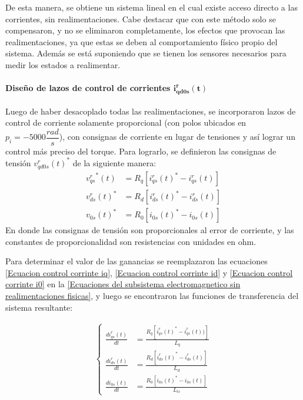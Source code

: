 \documentclass[a4paper, 10pt, onecolumn,journal]{ieeeconf}
\begin{document}
De esta manera, se obtiene un sistema lineal en el cual existe acceso directo a las corrientes, sin realimentaciones. Cabe destacar que con este método solo se compensaron, y no se eliminaron completamente, los efectos que provocan las realimentaciones, ya que  estas se deben al comportamiento físico propio del sistema. Además se está suponiendo que se tienen los sensores necesarios para medir los estados a realimentar.

\paragraph{\textbf{Diseño de lazos de control de corrientes $\mathbf{{i}^r_{qd0s}(t)}$}}
Luego de haber desacoplado todas las realimentaciones, se incorporaron lazos de control de corriente solamente proporcional (con polos ubicados en $p_{i}=-5000\dfrac{rad}{s}$), con consignas de corriente en lugar de tensiones y así lograr un control más preciso del torque.
Para lograrlo, se definieron las consignas de tensión  ${v^r_{qd0s}(t)}^*$ de la siguiente manera:
 \begin{align}
	{v^r_{qs}}^*(t) &= R_q \left[ {i^r_{qs}(t)}^* - i^r_{qs}(t) \right] \label{Ecuacion control corrinte iq}\\
	{v^r_{ds}(t)}^* &= R_d \left[ {i^r_{ds}(t)}^* - i^r_{ds}(t) \right] \label{Ecuacion control corrinte id}\\ 
	{v_{0s}(t)}^*   &= R_0 \left[ {i_{0s}(t)}^* - i_{0s}(t) \right] \label{Ecuacion control corrinte i0}
\end{align}
En donde las consignas de tensión son proporcionales al error de corriente, y las constantes de proporcionalidad son resistencias con unidades en ohm.

Para determinar el valor de las ganancias se reemplazaron las ecuaciones \eqref{Ecuacion control corrinte iq}, \eqref{Ecuacion control corrinte id} y \eqref{Ecuacion control corrinte i0} en la \cref{Ecuaciones del subsistema electromagnetico sin realimentaciones fisicas}, y luego se encontraron las funciones de transferencia del sistema resultante:

\begin{align}
	\begin{cases}
		\frac{d i^r_{qs}(t)}{dt} &= \frac{ R_q \left[ {i^r_{qs}(t)}^* - i^r_{qs}(t))\right]}{L_q}\\
		\frac{d i^r_{ds}(t)}{dt} &= \frac{R_d \left[ {i^r_{ds}(t)}^* - i^r_{ds}(t) \right]}{L_d} \\ 
		\frac{d i_{0s}(t)}{dt}   &= \frac{R_0 \left[ {i_{0s}(t)}^* - i_{0s}(t) \right]}{L_{ls}}
	\end{cases}	\label{Ecuaciones lazos de control de corriente}
\end{align}
\end{document}
